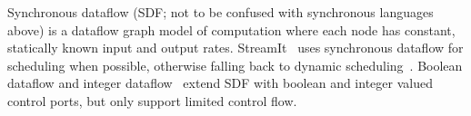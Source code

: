 


Synchronous dataflow (SDF; not to be confused with synchronous languages above) is a dataflow graph model of computation where each node has constant, statically known input and output rates. StreamIt~\cite{thies2002streamit} uses synchronous dataflow for scheduling when possible, otherwise falling back to dynamic scheduling~\cite{soule2013dynamic}. Boolean dataflow and integer dataflow~\cite{buck1993scheduling,buck1994static} extend SDF with boolean and integer valued control ports, but only support limited control flow.




%


